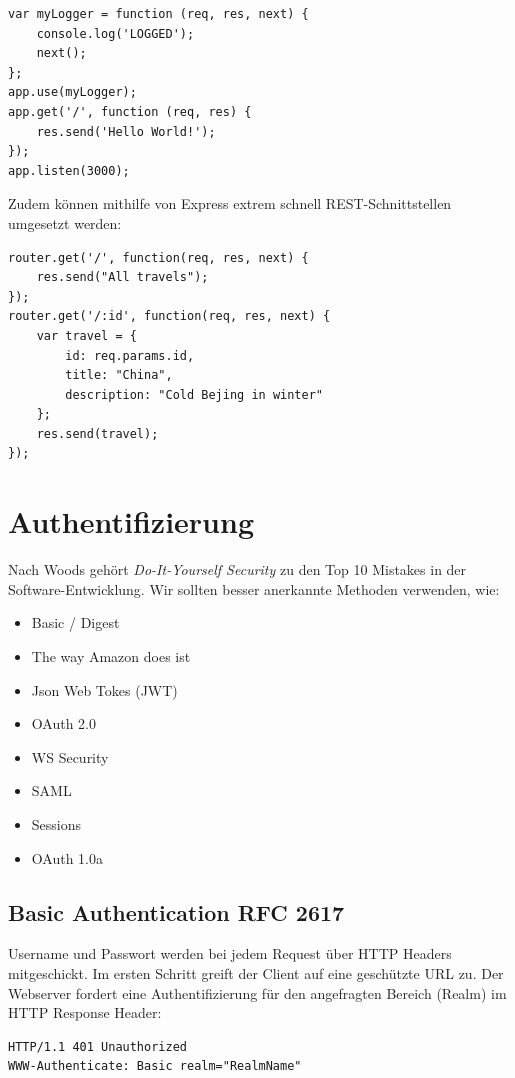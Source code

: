 \begin{lstlisting}[caption=Loggen jedes Requests]
var myLogger = function (req, res, next) {
	console.log('LOGGED');
	next();
};
app.use(myLogger);
app.get('/', function (req, res) {
	res.send('Hello World!');
});
app.listen(3000);
\end{lstlisting}

Zudem können mithilfe von Express extrem schnell REST-Schnittstellen umgesetzt werden:

\begin{lstlisting}[caption=REST mit Express]
router.get('/', function(req, res, next) {
	res.send("All travels");
});
router.get('/:id', function(req, res, next) {
	var travel = {
		id: req.params.id,
		title: "China",
		description: "Cold Bejing in winter"
	};
	res.send(travel);
});
\end{lstlisting}

\section{Authentifizierung}

Nach Woods gehört \textit{Do-It-Yourself Security} zu den Top 10 Mistakes in der Software-Entwicklung. Wir sollten besser anerkannte Methoden verwenden, wie:
\begin{itemize}
	\item Basic / Digest
	\item The way Amazon does ist
	\item Json Web Tokes (JWT)
	\item OAuth 2.0
	\item WS Security
	\item SAML
	\item Sessions
	\item OAuth 1.0a
\end{itemize}

\subsection{Basic Authentication RFC 2617}
Username und Passwort werden bei jedem Request über HTTP Headers mitgeschickt. Im ersten Schritt greift der Client auf eine geschützte URL zu. Der Webserver fordert eine Authentifizierung für den angefragten Bereich (Realm) im HTTP Response Header:

\begin{lstlisting}[caption=HTTP Response Header]
HTTP/1.1 401 Unauthorized
WWW-Authenticate: Basic realm="RealmName"
\end{lstlisting}

